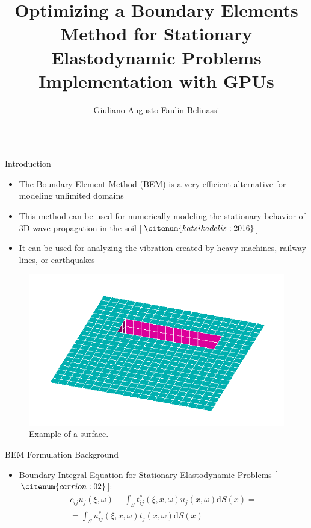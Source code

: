 \documentclass{beamer}
\author[giuliano.belinassi@usp.br]{Giuliano Augusto Faulin Belinassi}
\title{Optimizing a Boundary Elements Method for Stationary Elastodynamic Problems Implementation with GPUs}
\institute{Instituto de Matemática e Estatística - Universidade de São Paulo}
\begin{document}
\begin{frame}[fragile]\centering

\begin{columns}[T]

\begin{column}{.46\textwidth}

\begin{block}{Introduction}\justifying

\begin{itemize}

\item The Boundary Element Method (BEM) is a very efficient alternative for modeling unlimited domains
\item This method can be used for numerically modeling the stationary behavior of 3D wave propagation in the soil [$\citenum{katsikadelis:2016}$]
\item It can be used for analyzing the vibration created by heavy machines, railway lines, or earthquakes

\end{itemize}

\vspace{0.5cm}

\begin{figure}
	\centering
	\includegraphics[scale=0.7]{trincheira.png}
	\caption{Example of a surface.}
	\label{fig:surface}
\end{figure}

\end{block}

\begin{block}{BEM Formulation Background}\justifying

\begin{itemize}
\item Boundary Integral Equation for Stationary Elastodynamic Problems [$\citenum{carrion:02}$]:
\begin{equation}
\begin{split}
	c_{ij}u_{j}(\xi,\omega) + \int_S t_{ij}^*(\xi, x, \omega)u_j (x, \omega)\text{d}S(x) = \\
	= \int_S u_{ij}^*(\xi, x, \omega) t_j(x, \omega)\text{d}S(x) \label{bem_formulation} \nonumber
\end{split}
\end{equation}


\end{itemize}
\end{block}
\end{column}
\end{columns}
\end{frame}
\end{document}
